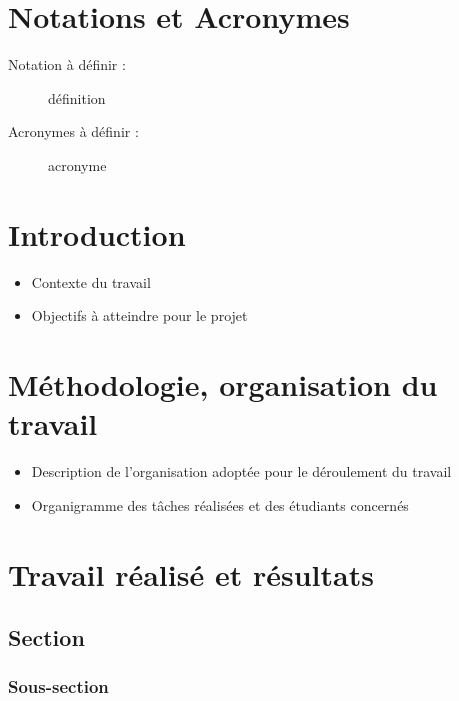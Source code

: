 \documentclass[a4paper, 12pt]{report} %
\begin{document}
  
	\chapter*{Notations et Acronymes}		%

\begin{description}
	\item[Notation à définir :] définition
	\item[Acronymes à définir :] acronyme
\end{description}

\newpage
	\chapter*{Introduction}				%

	\begin{itemize}
	\item Contexte du travail
	\item Objectifs à atteindre pour le projet
	\end{itemize}

	\chapter{Méthodologie, organisation du travail}

	\begin{itemize}
	\item Description de l’organisation adoptée pour le déroulement du travail
	\item Organigramme des tâches réalisées et des étudiants concernés
	\end{itemize}

	\chapter{Travail réalisé et résultats}

		\section{Section}

			\subsection{Sous-section}
\end{document}
